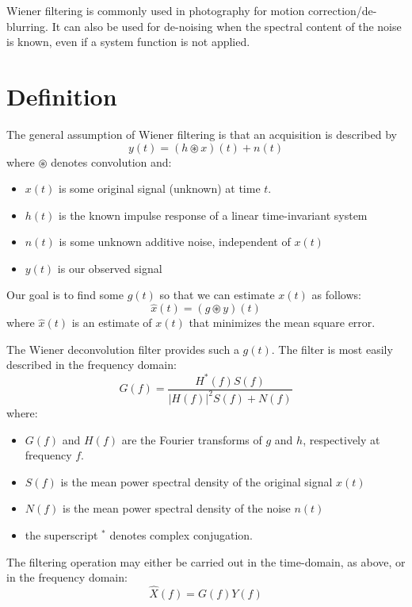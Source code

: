Wiener filtering is commonly used in photography for motion correction/de-blurring. It can also be used for de-noising when the spectral content of the noise is known, even if a system function is not applied.
\section{Definition}
The general assumption of Wiener filtering is that an acquisition is described by
\begin{equation}
 y(t) = (h\circledast x)(t) + n(t)
\end{equation}
where $\circledast$ denotes convolution and:
\begin{itemize}
	\item $ x(t)$ is some original signal (unknown) at time $ t $.
	\item $ h(t)$ is the known impulse response of a linear time-invariant system
	\item $ n(t)$ is some unknown additive noise, independent of $ x(t)$
	\item $ y(t)$ is our observed signal
\end{itemize}
Our goal is to find some $g(t)$ so that we can estimate $x(t)$ as follows:
\begin{equation}\hat {x}(t)=(g\circledast y)(t)\end{equation}
where $\hat {x}(t)$ is an estimate of $x(t)$ that minimizes the mean square error.

The Wiener deconvolution filter provides such a $ g(t)$.  The filter is most easily described in the frequency domain:
\begin{equation}
G(f) = \frac{H^*(f)S(f)}{ |H(f)|^2 S(f) + N(f) }
\end{equation}
where:
\begin{itemize}
\item $ G(f)$ and $ H(f)$ are the Fourier transforms of $ g$ and $ h$, respectively at frequency $ f $.
\item $ S(f)$ is the mean power spectral density of the original signal $ x(t)$
\item $ N(f)$ is the mean power spectral density of the noise $ n(t)$
\item the superscript ${}^*$ denotes complex conjugation.
\end{itemize}
The filtering operation may either be carried out in the time-domain, as above, or in the frequency domain:
\begin{equation}
\hat{X}(f) = G(f)Y(f)
\end{equation}

